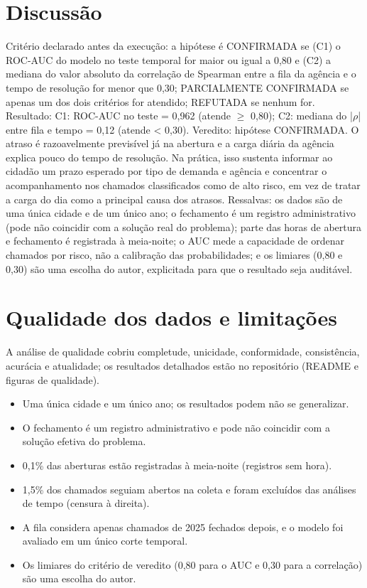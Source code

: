 \documentclass[11pt,a4paper]{article}
\begin{document}
\section{Discussão}
Critério declarado antes da execução: a hipótese é CONFIRMADA se (C1) o ROC-AUC do modelo no teste temporal for maior ou igual a 0,80 e (C2) a mediana do valor absoluto da correlação de Spearman entre a fila da agência e o tempo de resolução for menor que 0,30; PARCIALMENTE CONFIRMADA se apenas um dos dois critérios for atendido; REFUTADA se nenhum for. Resultado: C1: ROC-AUC no teste = 0,962 (atende $\geq$ 0,80); C2: mediana do |$\rho$| entre fila e tempo = 0,12 (atende < 0,30). Veredito: hipótese CONFIRMADA. O atraso é razoavelmente previsível já na abertura e a carga diária da agência explica pouco do tempo de resolução. Na prática, isso sustenta informar ao cidadão um prazo esperado por tipo de demanda e agência e concentrar o acompanhamento nos chamados classificados como de alto risco, em vez de tratar a carga do dia como a principal causa dos atrasos. Ressalvas: os dados são de uma única cidade e de um único ano; o fechamento é um registro administrativo (pode não coincidir com a solução real do problema); parte das horas de abertura e fechamento é registrada à meia-noite; o AUC mede a capacidade de ordenar chamados por risco, não a calibração das probabilidades; e os limiares (0,80 e 0,30) são uma escolha do autor, explicitada para que o resultado seja auditável.

\section{Qualidade dos dados e limitações}
A análise de qualidade cobriu completude, unicidade, conformidade, consistência, acurácia e atualidade; os resultados detalhados estão no repositório (README e figuras de qualidade).
\begin{itemize}
\item Uma única cidade e um único ano; os resultados podem não se generalizar.
\item O fechamento é um registro administrativo e pode não coincidir com a solução efetiva do problema.
\item 0,1\% das aberturas estão registradas à meia-noite (registros sem hora).
\item 1,5\% dos chamados seguiam abertos na coleta e foram excluídos das análises de tempo (censura à direita).
\item A fila considera apenas chamados de 2025 fechados depois, e o modelo foi avaliado em um único corte temporal.
\item Os limiares do critério de veredito (0,80 para o AUC e 0,30 para a correlação) são uma escolha do autor.
\end{itemize}
\end{document}
